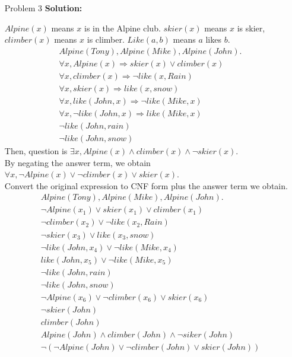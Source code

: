 \normalfont\documentclass[letterpaper,11pt]{article}
\begin{document}
\begin{enumerate}
\begin{enumerate}
	\end{enumerate}
\item[Problem 3]\textbf{Solution:}\par
	$Alpine(x)$ means $x$ is in the Alpine club. $skier(x)$ means $x$ is skier, $climber(x)$ means $x$ is climber. $Like(a,b)$ means $a$ likes $b$.
	\begin{align*}
		&Alpine(Tony), Alpine(Mike), Alpine(John).\\
		&\forall x, Alpine(x)  \Rightarrow skier(x)\lor climber(x)\\
		&\forall x, climber(x) \Rightarrow \neg like(x,Rain) \\
		&\forall x, skier(x) \Rightarrow like(x,snow) \\
		&\forall x, like(John, x) \Rightarrow \neg like(Mike, x)\\
		&\forall x, \neg like(John, x) \Rightarrow like(Mike, x)\\
		&\neg like(John, rain)\\
		&\neg like(John, snow)
	\end{align*}
	Then, question is
	$\exists x,Alpine(x) \land climber(x) \land \neg skier(x)$.\\
	By negating the answer term, we obtain $\forall x,\neg Alpine(x) \lor \neg climber(x) \lor skier(x)$.\\
	Convert the original expression to CNF form plus the answer term we obtain.
	\begin{align}
		&Alpine(Tony), Alpine(Mike), Alpine(John).\\
		&\neg Alpine(x_1)  \lor skier(x_1)\lor climber(x_1)\\
		&\neg climber(x_2) \lor \neg like(x_2,Rain) \\
		&\neg skier(x_3) \lor like(x_3,snow) \\
		&\neg like(John, x_4) \lor \neg like(Mike, x_4)\\
		&like(John, x_5) \lor \neg like(Mike, x_5)\\
		&\neg like(John, rain)\\
		&\neg like(John, snow)\\
		&\neg Alpine(x_6) \lor \neg climber(x_6) \lor skier(x_6)\\
		&\neg skier(John)\\
		&climber(John)\\
		& Alpine(John) \land climber(John) \land \neg siker(John)\\
		&\neg (\neg Alpine(John) \lor \neg climber(John) \lor skier(John))
	\end{align}

\end{enumerate}
\end{document}

